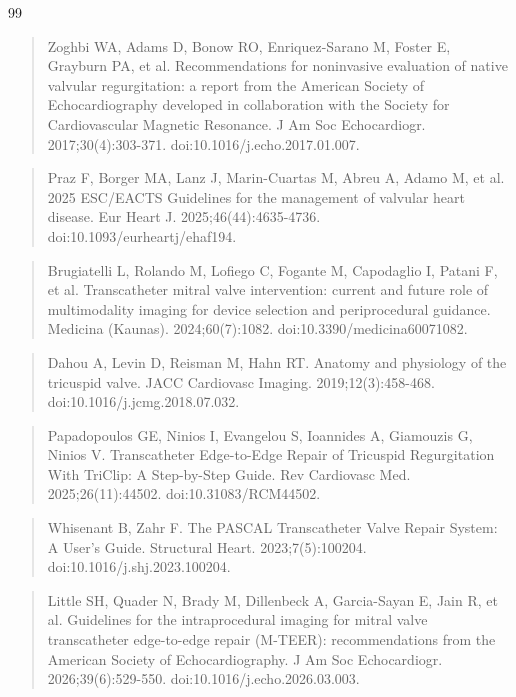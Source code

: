 \documentclass[12pt,a4paper,twoside]{article}
\begin{document}
\begin{thebibliography}{99}
\begin{quote}
  Zoghbi WA, Adams D, Bonow RO, Enriquez-Sarano M, Foster E, Grayburn PA, et al. Recommendations for noninvasive evaluation of native valvular regurgitation: a report from the American Society of Echocardiography developed in collaboration with the Society for Cardiovascular Magnetic Resonance. J Am Soc Echocardiogr. 2017;30(4):303-371. doi:10.1016/j.echo.2017.01.007.
  \end{quote}
  \begin{quote}
  Praz F, Borger MA, Lanz J, Marin-Cuartas M, Abreu A, Adamo M, et al. 2025 ESC/EACTS Guidelines for the management of valvular heart disease. Eur Heart J. 2025;46(44):4635-4736. doi:10.1093/eurheartj/ehaf194.
  \end{quote}
  \begin{quote}
  Brugiatelli L, Rolando M, Lofiego C, Fogante M, Capodaglio I, Patani F, et al. Transcatheter mitral valve intervention: current and future role of multimodality imaging for device selection and periprocedural guidance. Medicina (Kaunas). 2024;60(7):1082. doi:10.3390/medicina60071082.
  \end{quote}
  \begin{quote}
  Dahou A, Levin D, Reisman M, Hahn RT. Anatomy and physiology of the tricuspid valve. JACC Cardiovasc Imaging. 2019;12(3):458-468. doi:10.1016/j.jcmg.2018.07.032.
  \end{quote}
  \begin{quote}
  Papadopoulos GE, Ninios I, Evangelou S, Ioannides A, Giamouzis G, Ninios V. Transcatheter Edge-to-Edge Repair of Tricuspid Regurgitation With TriClip: A Step-by-Step Guide. Rev Cardiovasc Med. 2025;26(11):44502. doi:10.31083/RCM44502.
  \end{quote}
  \begin{quote}
  Whisenant B, Zahr F. The PASCAL Transcatheter Valve Repair System: A User's Guide. Structural Heart. 2023;7(5):100204. doi:10.1016/j.shj.2023.100204.
  \end{quote}
  \begin{quote}
  Little SH, Quader N, Brady M, Dillenbeck A, Garcia-Sayan E, Jain R, et al. Guidelines for the intraprocedural imaging for mitral valve transcatheter edge-to-edge repair (M-TEER): recommendations from the American Society of Echocardiography. J Am Soc Echocardiogr. 2026;39(6):529-550. doi:10.1016/j.echo.2026.03.003.
  \end{quote}
  \begin{quote}

\end{quote}
\end{thebibliography}
\end{document}
